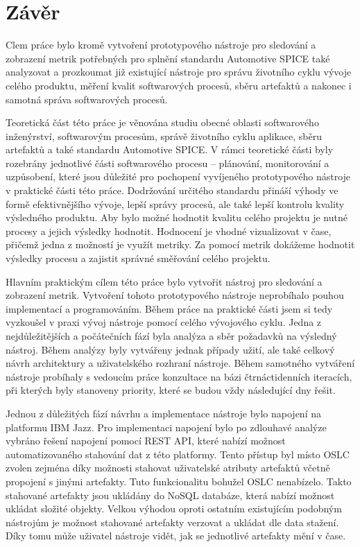 \documentclass[czech,master,public,dept460,male,cpdeclaration,oneside]{diploma}
\begin{document}
 
\section{Závěr}
Clem práce bylo kromě vytvoření prototypového nástroje pro sledování a zobrazení metrik potřebných pro splnění standardu Automotive SPICE také analyzovat a prozkoumat již existující nástroje pro správu životního cyklu vývoje celého produktu, měření kvalit softwarových procesů, sběru artefaktů a nakonec i samotná správa softwarových procesů.

Teoretická část této práce je věnována studiu obecné oblasti softwarového inženýrství, softwarovým procesům, správě životního cyklu aplikace, sběru artefaktů a také standardu Automotive SPICE. V rámci teoretické části byly rozebrány jednotlivé části softwarového procesu -- plánování, monitorování a uzpůsobení, které jsou důležité pro pochopení vyvíjeného prototypového nástroje v praktické části této práce. Dodržování určitého standardu přináší výhody ve formě efektivnějšího vývoje, lepší správy procesů, ale také lepší kontrolu kvality výsledného produktu. Aby bylo možné hodnotit kvalitu celého projektu je nutné procesy a jejich výsledky hodnotit. Hodnocení je vhodné vizualizovat v čase, přičemž jedna z možností je využít metriky. Za pomocí metrik dokážeme hodnotit výsledky procesu a zajistit správné směřování celého projektu. 

Hlavním praktickým cílem této práce bylo vytvořit nástroj pro sledování a zobrazení metrik. Vytvoření tohoto prototypového nástroje neprobíhalo pouhou implementací a programováním.  Během práce na praktické části jsem si tedy vyzkoušel v praxi vývoj nástroje pomocí celého vývojového cyklu. Jedna z nejdůležitějších a počátečních fází byla analýza a sběr požadavků na výsledný nástroj. Během analýzy byly vytvářeny jednak případy užití, ale také celkový návrh architektury a uživatelského rozhraní nástroje. Během samotného vytváření nástroje probíhaly s vedoucím práce konzultace na bázi čtrnáctidenních iteracích, při kterých byly stanoveny priority, které se budou vždy následující dny řešit. 

Jednou z důležitých fází návrhu a implementace nástroje bylo napojení na platformu IBM Jazz. Pro implementaci napojení bylo po zdlouhavé analýze vybráno řešení napojení pomocí REST API, které nabízí možnost automatizovaného stahování dat z této platformy. Tento přístup byl místo OSLC zvolen zejména díky možnosti stahovat uživatelské atributy artefaktů včetně propojení s jinými artefakty. Tuto funkcionalitu bohužel OSLC nenabízelo. Takto stahované artefakty jsou ukládány do NoSQL databáze, která nabízí možnost ukládat složité objekty. Velkou výhodou oproti ostatním existujícím podobným nástrojům je možnost stahované artefakty verzovat a ukládat dle data stažení. Díky tomu může uživatel nástroje vidět, jak se jednotlivé artefakty mění v čase.
\end{document}

